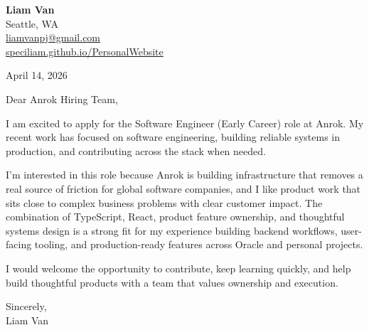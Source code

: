 \documentclass[letterpaper,11pt]{article}
\begin{document}
\begin{flushleft}
\textbf{\Large Liam Van} \\
Seattle, WA \\
\href{mailto:liamvanpj@gmail.com}{liamvanpj@gmail.com} \\
\href{https://speciliam.github.io/PersonalWebsite}{speciliam.github.io/PersonalWebsite}
\end{flushleft}

April 14, 2026

\noindent Dear Anrok Hiring Team,

\noindent I am excited to apply for the Software Engineer (Early Career) role at Anrok. My recent work has focused on software engineering, building reliable systems in production, and contributing across the stack when needed.

\noindent I'm interested in this role because Anrok is building infrastructure that removes a real source of friction for global software companies, and I like product work that sits close to complex business problems with clear customer impact. The combination of TypeScript, React, product feature ownership, and thoughtful systems design is a strong fit for my experience building backend workflows, user-facing tooling, and production-ready features across Oracle and personal projects.

\noindent I would welcome the opportunity to contribute, keep learning quickly, and help build thoughtful products with a team that values ownership and execution.

\noindent Sincerely, \\
Liam Van
\end{document}
